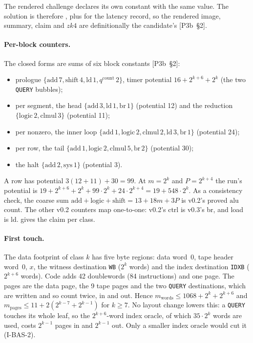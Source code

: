 The rendered challenge declares its own constant  with the same value. The solution is
therefore , plus  for the latency record, so the rendered image, summary, claim and $\mathit{zk4}$ are definitionally the
candidate's [P3b~§2].

\paragraph{Per-block counters.} The closed forms are sums of six block constants [P3b~§2]:
\begin{itemize}[nosep]
\item prologue $\{\mathrm{add}\,7,\mathrm{shift}\,4,\mathrm{ld}\,1,q^{\mathrm{count}}\,2\}$, timer
  potential $16+2^{k+6}+2^k$ (the two \texttt{QUERY} bubbles);
\item per segment, the head $\{\mathrm{add}\,3,\mathrm{ld}\,1,\mathrm{br}\,1\}$ (potential 12) and the
  reduction $\{\mathrm{logic}\,2,\mathrm{clmul}\,3\}$ (potential 11);
\item per nonzero, the inner loop $\{\mathrm{add}\,1,\mathrm{logic}\,2,\mathrm{clmul}\,2,\mathrm{ld}\,3,\mathrm{br}\,1\}$
  (potential 24);
\item per row, the tail $\{\mathrm{add}\,1,\mathrm{logic}\,2,\mathrm{clmul}\,5,\mathrm{br}\,2\}$ (potential 30);
\item the halt $\{\mathrm{add}\,2,\mathrm{sys}\,1\}$ (potential 3).
\end{itemize}
A row has potential $3(12+11)+30=99$. At $m=2^k$ and $P=2^{k+4}$ the run's potential is
$19+2^{k+6}+2^k+99\cdot2^k+24\cdot2^{k+4}=19+548\cdot2^k$. As a consistency check, the coarse sum
$\mathrm{add}+\mathrm{logic}+\mathrm{shift}=13+18m+3P$ is v0.2's proved $\mathrm{alu}$ count. The
other v0.2 counters map one-to-one: v0.2's ctrl is v0.3's br, and load is ld. 
gives the claim per class.

\paragraph{First touch.} The data footprint of class $k$ has five byte regions: data word~0, tape
header word~0, $x$, the witness destination \texttt{WB} ($2^k$ words) and the index destination
\texttt{IDXB} ($2^{k+6}$ words). Code adds 42 doublewords (84 instructions) and one page. The pages are
the data page, the 9 tape pages and the two \texttt{QUERY} destinations, which are written and so
count twice, in and out. Hence $m_{\mathrm{words}}\le1068+2^k+2^{k+6}$ and
$m_{\mathrm{pages}}\le11+2(2^{k-7}+2^{k-1})$ for $k\ge7$. No layout change lowers this: a
\texttt{QUERY} touches its whole leaf, so the $2^{k+6}$-word index oracle, of which $35\cdot2^k$
words are used, costs $2^{k-1}$ pages in and $2^{k-1}$ out. Only a smaller index oracle would cut
it (I-BAS-2).

